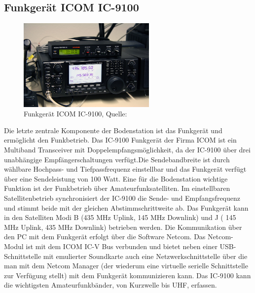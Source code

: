 \subsection{Funkgerät ICOM IC-9100}
\label{chap:funkgerät}
\begin{figure}[h]
	\centering
	\includegraphics[width=0.6\textwidth]{images/radio}
	\caption{Funkgerät ICOM IC-9100, Quelle: \cite{dk0te}}
	\label{fig:radio}
\end{figure}
Die letzte zentrale Komponente der Bodenstation ist das Funkgerät und ermöglicht den Funkbetrieb. Das IC-9100 Funkgerät der Firma ICOM ist ein 
Multiband Transceiver mit Doppelempfangsmöglichkeit, da der IC-9100 über drei unabhängige Empfängerschaltungen verfügt.Die Sendebandbreite ist durch 
wählbare Hochpass- und Tiefpassfrequenz einstellbar und das Funkgerät verfügt über eine Sendeleistung von 100 Watt. Eine für die Bodenstation 
wichtige Funktion ist der Funkbetrieb über Amateurfunksatelliten. Im einstellbaren Satellitenbetrieb synchronisiert der IC-9100 die Sende-  und 
Empfangsfrequenz und stimmt beide mit der gleichen Abstimmschrittweite ab. Das Funkgerät kann in den Satelliten Modi B (435 MHz Uplink, 145 MHz 
Downlink) und J ( 145 MHz Uplink, 435 MHz Downlink) betrieben werden. Die Kommunikation über den PC mit dem Funkgerät erfolgt über die Software 
Netcom.  Das Netcom-Modul ist mit dem ICOM IC-V Bus verbunden und bietet neben einer USB-Schnittstelle mit emulierter 
Soundkarte auch eine Netzwerkschnittstelle über die man mit dem Netcom Manager (der wiederum eine virtuelle serielle Schnittstelle zur Verfügung 
stellt) mit dem Funkgerät kommunizieren kann. Das IC-9100 kann die wichtigsten Amateurfunkbänder, von Kurzwelle bis \ac{UHF}, 
erfassen. 





